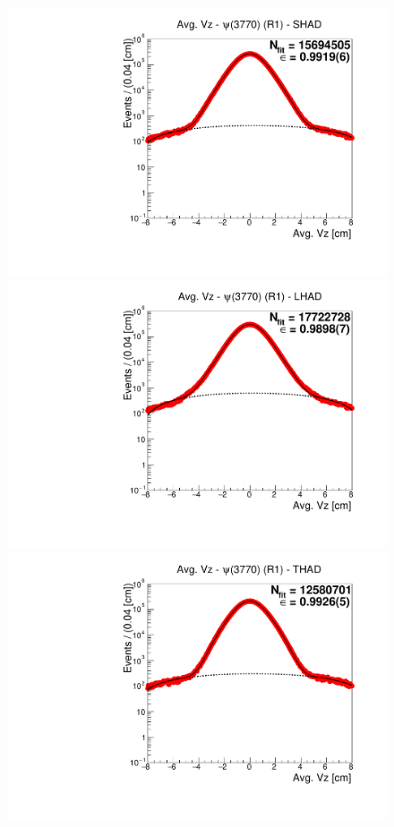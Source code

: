 \begin{figure}[H]
\centering
\includegraphics[scale=0.25]{figures/plots/nonDDbar_fit_results/psipp/fit_3773_R1_data_SHAD.pdf}
\hspace{-0.5cm}
\includegraphics[scale=0.25]{figures/plots/nonDDbar_fit_results/psipp/fit_3773_R1_data_LHAD.pdf}
\hspace{-0.5cm}
\includegraphics[scale=0.25]{figures/plots/nonDDbar_fit_results/psipp/fit_3773_R1_data_THAD.pdf}

\end{figure}
